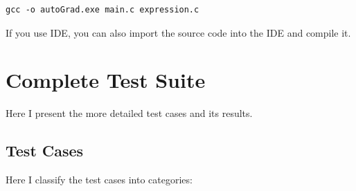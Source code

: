\documentclass[a4paper,oneside]{book}
\begin{document}
\begin{verbatim}
gcc -o autoGrad.exe main.c expression.c
\end{verbatim}

If you use IDE, you can also import the source code into the IDE and compile it.

\chapter{Complete Test Suite}
\label{chap:raw_test_results}

Here I present the more detailed test cases and its results.

\section{Test Cases}

Here I classify the test cases into categories:
\end{document}
